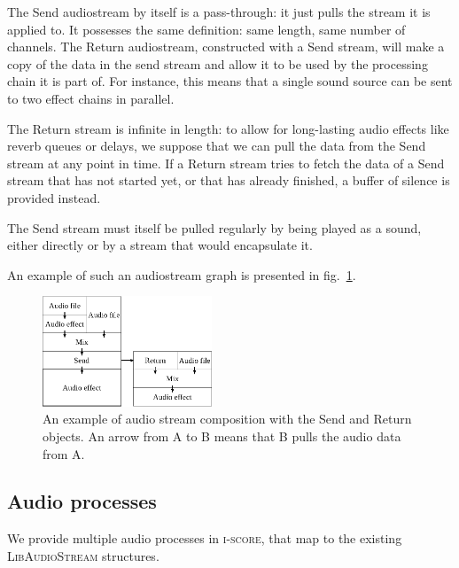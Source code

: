 \documentclass{article}
\newcommand*{\LibAudioStream}{\textsc{LibAudioStream}\xspace}
\newcommand*{\iscore}{\textsc{i-score}\xspace}
\begin{document}
The Send audiostream by itself is a pass-through: it just pulls the stream it is applied to.
It possesses the same definition: same length, same number of channels.
The Return audiostream, constructed with a Send stream, will make a copy of the data in 
the send stream and allow it to be used by the processing chain it is part of.
For instance, this means that a single sound source can be sent to two effect chains in parallel.

The Return stream is infinite in length: to allow for long-lasting audio effects 
like reverb queues or delays, we suppose that we can pull the data from the Send stream at any point in time.
If a Return stream tries to fetch the data of a Send stream that has not started yet, or that has already finished, a buffer of silence is provided instead.

The Send stream must itself be pulled regularly by being played as a sound, either directly or by a stream that would encapsulate it.

An example of such an audiostream graph is presented in fig.~\ref{fig.mixsendreturn}.

\begin{figure}[h]
	\centering
	\includegraphics[width=0.45\textwidth]{figures/graph2.eps}
	\caption{An example of audio stream composition with the Send and Return objects. An arrow from A to B means that B pulls the audio data from A.}
	\label{fig.mixsendreturn}
\end{figure}

\subsection{Audio processes}
\label{sec.processes}
We provide multiple audio processes in \iscore, that map 
to the existing \LibAudioStream structures.
\end{document}
